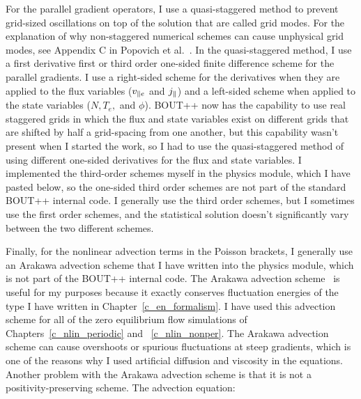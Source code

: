 For the parallel gradient operators, I use a quasi-staggered method to prevent grid-sized oscillations on top of the solution that are called grid modes. 
For the explanation of why non-staggered numerical schemes can cause unphysical grid modes, see Appendix C in Popovich et al.~\cite{popovich2010b}.
In the quasi-staggered method, I use a first derivative first or third order one-sided finite difference scheme for the parallel gradients. I use a right-sided scheme for the derivatives when
they are applied to the flux variables ($v_{\parallel e}$ and $j_\parallel$) and a left-sided scheme when applied to the state variables ($N, T_e,$ and $\phi$). BOUT++ now has the capability to use real
staggered grids in which the flux and state variables exist on different grids that are shifted by half a grid-spacing from one another, but this capability wasn't present when I started
the work, so I had to use the quasi-staggered method of using different one-sided derivatives for the flux and state variables. I implemented the third-order schemes myself in the physics module,
which I have pasted below, so the one-sided third order schemes are not part of the standard BOUT++ internal code. I generally use the third order schemes, but I sometimes use the first order
schemes, and the statistical solution doesn't significantly vary between the two different schemes.

Finally, for the nonlinear advection terms in the Poisson brackets, I generally use an Arakawa advection scheme that I have written into the physics module, which is not part of the BOUT++ internal
code. The Arakawa advection scheme~\cite{arakawa1966} is useful for my purposes because it exactly conserves fluctuation energies of the type I have written in Chapter~\ref{c_en_formalism}.
I have used this advection scheme for all of the zero equilibrium flow simulations of Chapters~\ref{c_nlin_periodic} and ~\ref{c_nlin_nonper}. The Arakawa advection scheme can cause overshoots
or spurious fluctuations at steep gradients, which is one of the reasons why I used artificial diffusion and viscosity in the equations. Another problem with the Arakawa advection scheme
is that it is not a positivity-preserving scheme. The advection equation:


